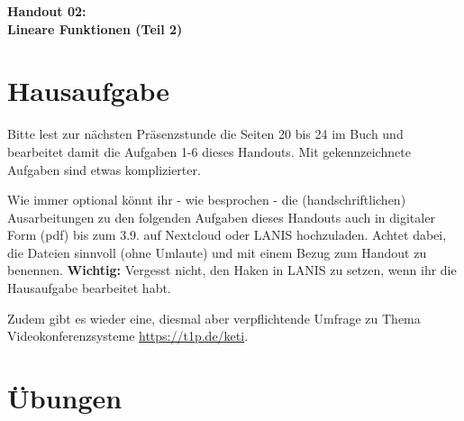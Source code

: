 \documentclass[a4paper,ngerman,12pt]{exam}
\begin{document}
\vspace*{0.3cm}
\begin{center}
  \huge\bfseries Handout 02:\\ Lineare Funktionen (Teil 2)
\end{center}

\section*{Hausaufgabe}

\par Bitte lest zur nächsten Präsenzstunde die Seiten 20 bis 24 im Buch und bearbeitet damit die Aufgaben 1-6 dieses Handouts. Mit  gekennzeichnete Aufgaben sind etwas komplizierter.

\par Wie immer optional könnt ihr - wie besprochen - die (handschriftlichen) Ausarbeitungen zu den folgenden Aufgaben dieses Handouts auch in digitaler Form (pdf) bis zum 3.9. auf Nextcloud oder LANIS hochzuladen. Achtet dabei, die Dateien sinnvoll (ohne Umlaute) und mit einem Bezug zum Handout zu benennen. \textbf{Wichtig:} Vergesst nicht, den Haken in LANIS zu setzen, wenn ihr die Hausaufgabe bearbeitet habt.

\par Zudem gibt es wieder eine, diesmal aber verpflichtende Umfrage zu Thema \glqq Videokonferenzsysteme\grqq{}  \href{https://t1p.de/keti}{https://t1p.de/keti}.

\section*{Übungen}
\end{document}
